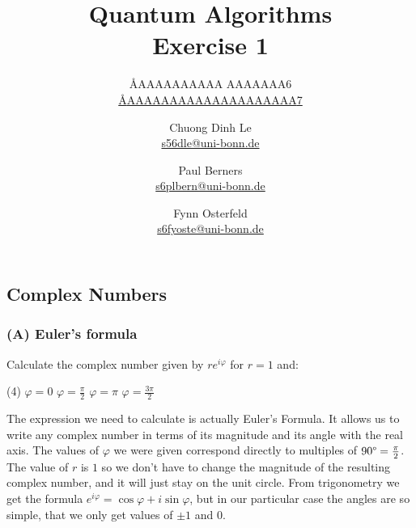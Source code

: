 \documentclass{article}
\title{Quantum Algorithms \\ Exercise 1}
\author{
  \AA{AAAAAAAAAA AAAAAAA}{6} \\ \href{mailto:\AA{AAAAAAAAAAAAAAAAAAAA}{7}}{\AA{AAAAAAAAAAAAAAAAAAAA}{7}} \and
  Chuong Dinh Le \\ \href{mailto:s56dle@uni-bonn.de}{s56dle@uni-bonn.de} \and
  Paul Berners \\ \href{mailto:s6plbern@uni-bonn.de}{s6plbern@uni-bonn.de} \and
  Fynn Osterfeld \\ \href{mailto:s6fyoste@uni-bonn.de}{s6fyoste@uni-bonn.de}
}
\let\phi\varphi
\begin{document}
  \maketitle

  \setcounter{section}{1}
  \subsection{Complex Numbers}
  \subsubsection*{(A) Euler's formula}
  \begin{centerframebox}
    Calculate the complex number given by $re^{i\phi}$ for $r = 1$ and:
    \begin{tasks}[style=itemize](4)
      \task $\phi = 0$
      \task $\phi = \frac{\pi}{2}$
      \task $\phi = \pi$
      \task $\phi = \frac{3\pi}{2}$
    \end{tasks}
  \end{centerframebox}
  \begin{wrapfigure}{r}{4cm}
    \vspace{-.5cm}
    \centering
  \end{wrapfigure}

  The expression we need to calculate is actually Euler's Formula.
  It allows us to write any complex number in terms of its magnitude and its angle with the real axis.
  The values of $\phi$ we were given correspond directly to multiples of $90\degree = \frac{\pi}{2}$.
  The value of $r$ is $1$ so we don't have to change the magnitude of the resulting complex number,
  and it will just stay on the unit circle.
  From trigonometry we get the formula $e^{i\phi} = \cos \phi + i\sin \phi$,
  but in our particular case the angles are so simple, that we only get values of $\pm 1$ and $0$.
\end{document}
